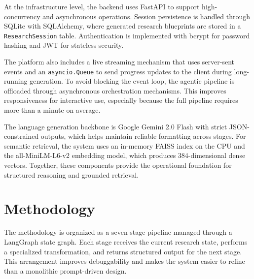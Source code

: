 \documentclass[conference]{IEEEtran}
\begin{document}
At the infrastructure level, the backend uses FastAPI to support high-concurrency and asynchronous operations. Session persistence is handled through SQLite with SQLAlchemy, where generated research blueprints are stored in a \texttt{ResearchSession} table. Authentication is implemented with bcrypt for password hashing and JWT for stateless security.

The platform also includes a live streaming mechanism that uses server-sent events and an \texttt{asyncio.Queue} to send progress updates to the client during long-running generation. To avoid blocking the event loop, the agentic pipeline is offloaded through asynchronous orchestration mechanisms. This improves responsiveness for interactive use, especially because the full pipeline requires more than a minute on average.

The language generation backbone is Google Gemini 2.0 Flash with strict JSON-constrained outputs, which helps maintain reliable formatting across stages. For semantic retrieval, the system uses an in-memory FAISS index on the CPU and the all-MiniLM-L6-v2 embedding model, which produces 384-dimensional dense vectors. Together, these components provide the operational foundation for structured reasoning and grounded retrieval.

\section{Methodology}
The methodology is organized as a seven-stage pipeline managed through a LangGraph state graph. Each stage receives the current research state, performs a specialized transformation, and returns structured output for the next stage. This arrangement improves debuggability and makes the system easier to refine than a monolithic prompt-driven design.
\end{document}
